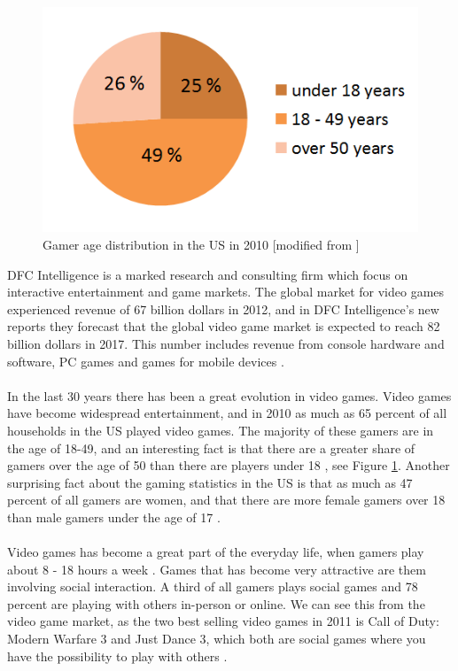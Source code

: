 \begin{figure}
\begin{center}
\includegraphics[scale=0.5]{gamersus}
\caption[Gamer age distribution]{Gamer age distribution in the US in 2010 [modified from \cite{statistics2012}]}
\label{fig:GamersUS}
\end{center}
\end{figure}
DFC Intelligence is a marked research and consulting firm which focus on interactive entertainment and game markets. The global market for video games experienced revenue of 67 billion dollars in 2012, and in DFC Intelligence's new reports they forecast that the global video game market is expected to reach 82 billion dollars in 2017. This number includes revenue from console hardware and software, PC games and games for mobile devices \cite{videogameforcast} \cite{aboutdfcint}.\\ \\
In the last 30 years there has been a great evolution in video games. Video games have become widespread entertainment, and in 2010 as much as 65 percent of all households in the US played video games. The majority of these gamers are in the age of 18-49, and an interesting fact is that there are a greater share of gamers over the age of 50 than there are players under 18 \cite{statistics2010} \cite{statistics2012}, see Figure \ref{fig:GamersUS}. Another surprising fact about the gaming statistics in the US is that as much as 47 percent of all gamers are women, and that there are more female gamers over 18 than male gamers under the age of 17 \cite{statistics2012real}. \\ \\
Video games has become a great part of the everyday life, when gamers play about 8 - 18 hours a week \cite{statistics2010} \cite{statistics2012}. Games that has become very attractive are them involving social interaction. A third of all gamers plays social games and 78 percent are playing with others in-person or online. We can see this from the video game market, as the two best selling video games in 2011 is Call of Duty: Modern Warfare 3 and Just Dance 3, which both are social games where you have the possibility to play with others \cite{statistics2012real}. \\ \\ 
